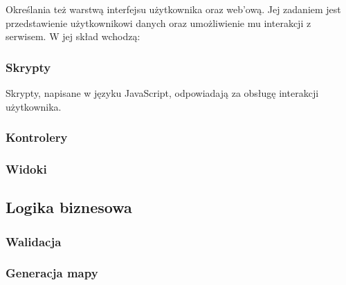 \documentclass[a4paper, 10pt, titlepage]{article}
\begin{document}
Określania też warstwą interfejsu użytkownika oraz web'ową. Jej zadaniem jest przedstawienie użytkownikowi danych oraz umożliwienie mu interakcji z serwisem. W jej skład wchodzą:

\subsubsection{Skrypty}

Skrypty, napisane w języku JavaScript, odpowiadają za obsługę interakcji użytkownika. 

\subsubsection{Kontrolery}

\subsubsection{Widoki}

\subsection{Logika biznesowa}

\subsubsection{Walidacja}

\subsubsection{Generacja mapy}
\end{document}
